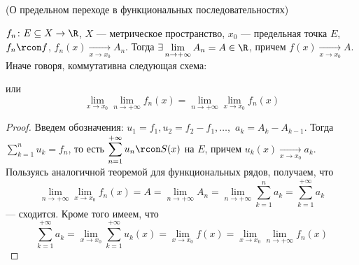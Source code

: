\begin{theorem}(О предельном переходе в функциональных последовательностях)

    $f_n \colon E \subseteq X \to \R$, $X$ --- метрическое пространство,
    $x_0$ --- предельная точка $E$, $f_n \rcon f$, $f_n(x) \xrightarrow[x \to
    x_0]{} A_n$. Тогда $\displaystyle \exists \lim_{n \to +\infty}{A_n} = A \in
    \R$, причем $f(x) \xrightarrow[x \to x_0]{} A$.
    Иначе говоря, коммутативна следующая схема:


    или
\[
    \lim_{x \to x_0}{\lim_{n \to +\infty}{f_n(x)}}
    = \lim_{n \to +\infty}{\lim_{x \to x_0}{f_n(x)}}
\]
\end{theorem}
\begin{proof}
    Введем обозначения: $u_1 = f_1, u_2 = f_2 - f_1, \ldots,$ $a_k = A_k -
    A_{k - 1}$. Тогда $\displaystyle \sum_{k = 1}^{n}{u_k} = f_n$, то есть
    $\displaystyle \sum_{n = 1}^{+\infty}{u_n} \rcon S(x)$ на $E$, причем
    $u_k(x) \xrightarrow[x \to x_0]{} a_k$. Пользуясь аналогичной теоремой для
    функциональных рядов, получаем, что
\[
    \lim_{n \to +\infty}{\lim_{x \to x_0}{f_n(x)}} = A = \lim_{n \to
    +\infty}{A_n} = \lim_{n \to +\infty}{\sum_{k = 1}^{n}{a_k}} = \sum_{k =
    1}^{+\infty}{a_k}
\]
    --- сходится. Кроме того имеем, что
\[
    \sum_{k = 1}^{+\infty}{a_k} = \lim_{x \to x_0}{\sum_{k =
    1}^{+\infty}{u_k(x)}} = \lim_{x \to x_0}{f(x)} = \lim_{x \to x_0}{\lim_{n
    \to +\infty}{f_n(x)}}
\]

\end{proof}

